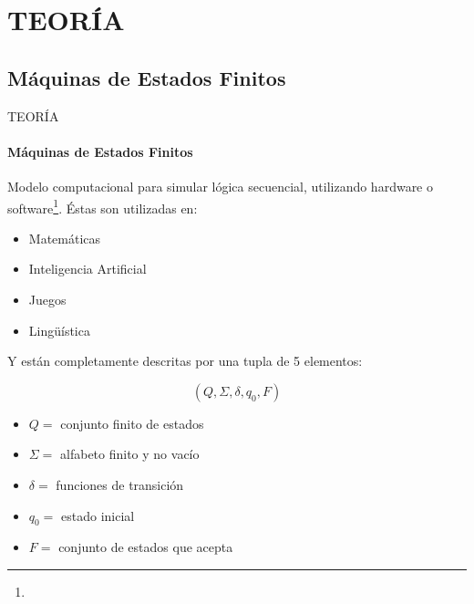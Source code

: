 \section{TEORÍA}
\subsection{Máquinas de Estados Finitos}
\begin{frame}{TEORÍA}
\framesubtitle{Máquinas de Estados Finitos}
    Modelo computacional para simular lógica secuencial, utilizando hardware o software\footnote{}. Éstas son utilizadas en:
        \begin{itemize}
            \item Matemáticas
            \item Inteligencia Artificial
            \item Juegos
            \item Lingüística
        \end{itemize}
        Y están completamente descritas por una tupla de 5 elementos:
        \begin{multicols}{2}
          \begin{equation*}
          	(Q,\Sigma,\delta,q_0,F)
          \end{equation*}
          \columnbreak
          \begin{itemize}
          \item $Q=$ conjunto finito de estados
          \item $\Sigma=$ alfabeto finito y no vacío
          \item $\delta=$ funciones de transición
          \item $q_0=$ estado inicial
          \item $F=$ conjunto de estados que acepta
          \end{itemize}\end{multicols}
\end{frame}

